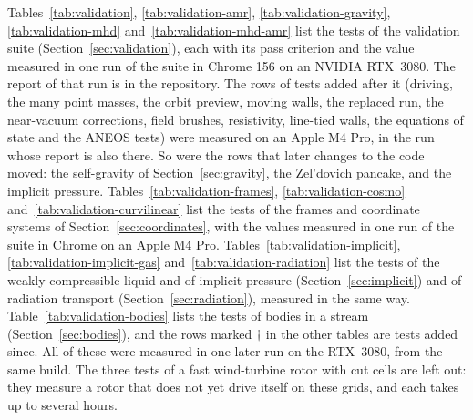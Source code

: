 \documentclass[twocolumn]{aastex701}
\begin{document}
Tables~\ref{tab:validation}, \ref{tab:validation-amr}, \ref{tab:validation-gravity}, \ref{tab:validation-mhd} and~\ref{tab:validation-mhd-amr} list the tests of the validation suite (Section~\ref{sec:validation}), each with its pass criterion and the value measured in one run of the suite in Chrome 156 on an NVIDIA RTX~3080. The report of that run is in the repository. The rows of tests added after it (driving, the many point masses, the orbit preview, moving walls, the replaced run, the near-vacuum corrections, field brushes, resistivity, line-tied walls, the equations of state and the ANEOS tests) were measured on an Apple M4 Pro, in the run whose report is also there. So were the rows that later changes to the code moved: the self-gravity of Section~\ref{sec:gravity}, the Zel'dovich pancake, and the implicit pressure. Tables~\ref{tab:validation-frames}, \ref{tab:validation-cosmo} and~\ref{tab:validation-curvilinear} list the tests of the frames and coordinate systems of Section~\ref{sec:coordinates}, with the values measured in one run of the suite in Chrome on an Apple M4 Pro. Tables~\ref{tab:validation-implicit}, \ref{tab:validation-implicit-gas} and~\ref{tab:validation-radiation} list the tests of the weakly compressible liquid and of implicit pressure (Section~\ref{sec:implicit}) and of radiation transport (Section~\ref{sec:radiation}), measured in the same way. Table~\ref{tab:validation-bodies} lists the tests of bodies in a stream (Section~\ref{sec:bodies}), and the rows marked $\dagger$ in the other tables are tests added since. All of these were measured in one later run on the RTX~3080, from the same build. The three tests of a fast wind-turbine rotor with cut cells are left out: they measure a rotor that does not yet drive itself on these grids, and each takes up to several hours.
\end{document}
